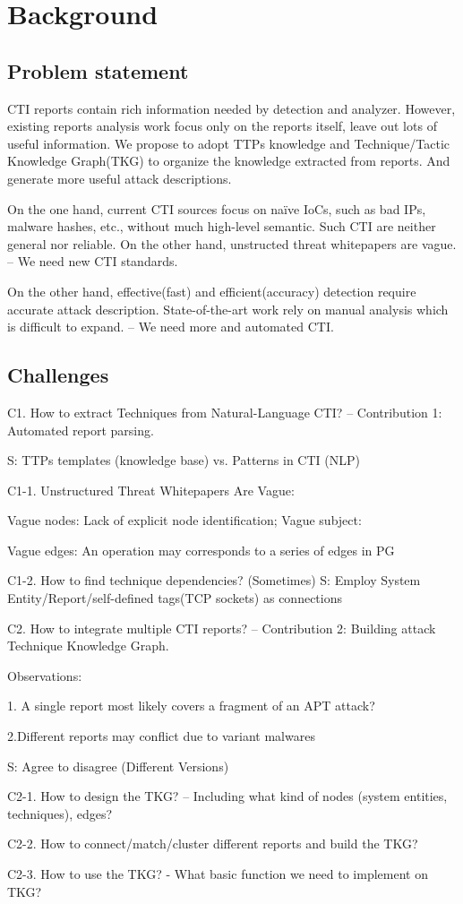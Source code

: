 \section{Background}
\label{sec:background}

\subsection{Problem statement}

CTI reports contain rich information needed by detection and analyzer. However, existing reports analysis work focus only on the reports itself, leave out lots of useful information. We propose to adopt TTPs knowledge and Technique/Tactic Knowledge Graph(TKG) to organize the knowledge extracted from reports. And generate more useful attack descriptions.

On the one hand, current CTI sources focus on naïve IoCs, such as bad IPs, malware hashes, etc., without much high-level semantic. Such CTI are neither general nor reliable. \cite{Li2019} On the other hand, unstructed threat whitepapers are vague. – We need new CTI standards. 

On the other hand, effective(fast) and efficient(accuracy) detection require accurate attack description. State-of-the-art work rely on manual analysis \cite{Milajerdi2019} which is difficult to expand. – We need more and automated CTI. 

\subsection{Challenges}

C1. How to extract Techniques from Natural-Language CTI? – Contribution 1: Automated report parsing.

S: TTPs templates (knowledge base) vs. Patterns in CTI (NLP)

C1-1. Unstructured Threat Whitepapers Are Vague:

Vague nodes: Lack of explicit node identification; Vague subject: 

Vague edges: An operation may corresponds to a series of edges in PG

C1-2. How to find technique dependencies? (Sometimes)
S: Employ System Entity/Report/self-defined tags(TCP sockets) as connections

C2. How to integrate multiple CTI reports? – Contribution 2: Building attack Technique Knowledge Graph.

Observations:

1. A single report most likely covers a fragment of an APT attack?

2.Different reports may conflict due to variant malwares

S: Agree to disagree (Different Versions)

C2-1. How to design the TKG? – Including what kind of nodes (system entities, techniques), edges? 

C2-2. How to connect/match/cluster different reports and build the TKG?

C2-3. How to use the TKG?  - What basic function we need to implement on TKG?
